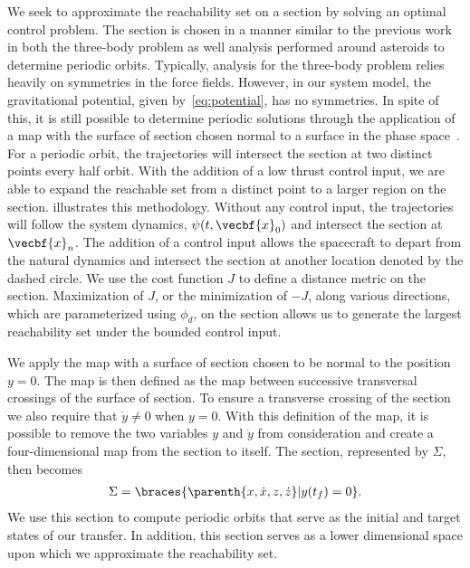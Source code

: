 We seek to approximate the reachability set on a \Poincare section by solving an optimal control problem.
The \Poincare section is chosen in a manner similar to the previous work in both the three-body problem as well analysis performed around asteroids to determine periodic orbits.
Typically, analysis for the three-body problem relies heavily on symmetries in the force fields.
However, in our system model, the gravitational potential, given by~\cref{eq:potential}, has no symmetries.
In spite of this, it is still possible to determine periodic solutions through the application of a \Poincare map with the surface of section chosen normal to a surface in the phase space~\cite{scheeres2000}.
For a periodic orbit, the trajectories will intersect the \Poincare section at two distinct points every half orbit.
With the addition of a low thrust control input, we are able to expand the reachable set from a distinct point to a larger region on the \Poincare section.
 illustrates this methodology.
Without any control input, the trajectories will follow the system dynamics, \( \psi(t, \vecbf{x}_0 ) \) and intersect the \Poincare section at \( \vecbf{x}_n\).
The addition of a control input allows the spacecraft to depart from the natural dynamics and intersect the section at another location denoted by the dashed circle.
We use the cost function \( J \) to define a distance metric on the \Poincare section.
Maximization of \( J \), or the minimization of \( -J \), along various directions, which are parameterized using \( \phi_d \), on the \Poincare section allows us to generate the largest reachability set under the bounded control input.

We apply the \Poincare map with a surface of section chosen to be normal to the position \( y = 0 \).
The \Poincare map is then defined as the map between successive transversal crossings of the surface of section.
To ensure a transverse crossing of the section we also require that \( \dot{y} \neq 0 \) when \( y = 0 \).
With this definition of the \Poincare map, it is possible to remove the two variables \( y \) and \( \dot{y} \) from consideration and create a four-dimensional map from the \Poincare section to itself.
The \Poincare section, represented by \( \Sigma \), then becomes
\begin{align}\label{eq:poincare_section}
    \Sigma = \braces{\parenth{x, \dot{x}, z, \dot{z}} | y(t_f) = 0 }.
\end{align}
We use this section to compute periodic orbits that serve as the initial and target states of our transfer.
In addition, this section serves as a lower dimensional space upon which we approximate the reachability set.

